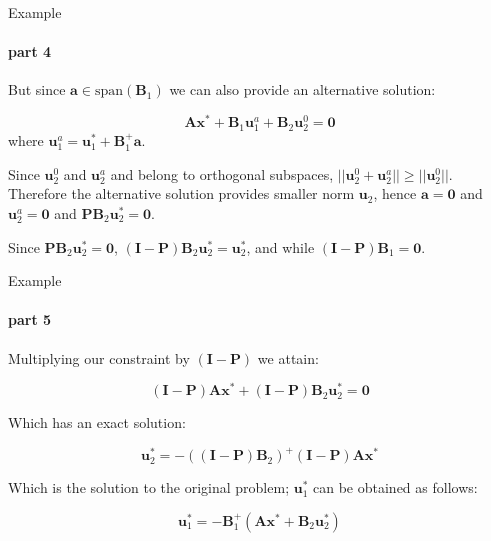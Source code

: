 \documentclass{beamer}
\begin{document}
\begin{frame}{Example}
\framesubtitle{part 4}
\begin{flushleft}

But since $\mathbf{a} \in \text{span}(\mathbf{B}_1)$ we can also provide an alternative solution:

\begin{equation}
    \mathbf{A} \mathbf{x}^* + \mathbf{B}_1 \mathbf{u}^a_1 + \mathbf{B}_2 \mathbf{u}^0_2 = \mathbf{0}
\end{equation}
%
where $\mathbf{u}^a_1 = \mathbf{u}^*_1 + \mathbf{B}^+_1 \mathbf{a}$.

\bigskip

Since $\mathbf{u}^0_2$ and $\mathbf{u}^a_2$ and belong to orthogonal subspaces, $||\mathbf{u}^0_2 + \mathbf{u}^a_2|| \geq ||\mathbf{u}^0_2||$. Therefore the alternative solution provides smaller norm $\mathbf{u}_2$, hence $\mathbf{a} = \mathbf{0}$ and $\mathbf{u}^a_2 = \mathbf{0}$ and $\mathbf{P} \mathbf{B}_2 \mathbf{u}^*_2 = \mathbf{0}$.

\bigskip

Since $\mathbf{P} \mathbf{B}_2 \mathbf{u}^*_2 = \mathbf{0}$, $(\mathbf{I} - \mathbf{P}) \mathbf{B}_2 \mathbf{u}^*_2 = \mathbf{u}^*_2$, and while $(\mathbf{I} - \mathbf{P}) \mathbf{B}_1 = \mathbf{0}$.


\end{flushleft}
\end{frame}




\begin{frame}{Example}
\framesubtitle{part 5}
\begin{flushleft}

 Multiplying our constraint by $(\mathbf{I} - \mathbf{P})$ we attain:

\begin{equation}
    (\mathbf{I} - \mathbf{P}) \mathbf{A} \mathbf{x}^* + (\mathbf{I} - \mathbf{P}) \mathbf{B}_2 \mathbf{u}^*_2 = \mathbf{0}
\end{equation}

Which has an exact solution:

\begin{equation}
\label{Solution_u2}
     \mathbf{u}^*_2 = -((\mathbf{I} - \mathbf{P}) \mathbf{B}_2)^+(\mathbf{I} - \mathbf{P}) \mathbf{A} \mathbf{x}^*
\end{equation}

Which is the solution to the original problem; $\mathbf{u}^*_1$ can be obtained as follows:

\begin{equation}
\label{Solution_u1}
      \mathbf{u}^*_1  = -\mathbf{B}^+_1(\mathbf{A} \mathbf{x}^* + \mathbf{B}_2 \mathbf{u}^*_2)
\end{equation}


\end{flushleft}
\end{frame}
\end{document}
